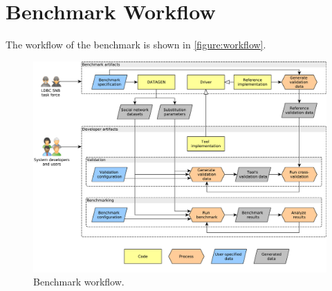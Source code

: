 
\section{Benchmark Workflow}
\label{section:workflow}

The workflow of the benchmark is shown in \autoref{figure:workflow}.

\begin{figure}[htb]
    \centering
    \includegraphics[width=\linewidth]{figures/workflow}
    \caption{Benchmark workflow.}
    \label{figure:workflow}
\end{figure}
